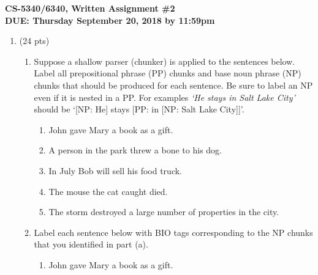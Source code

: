 \documentclass[11pt]{article}
\begin{document}
\large
\begin{center}
{\bf CS-5340/6340, Written Assignment \#2} \\
{\bf DUE: Thursday September 20, 2018 by 11:59pm}
\end{center}
\normalsize

\begin{enumerate}  



\item (24 pts)
\begin{enumerate} 

\item Suppose a shallow parser (chunker) is applied to the sentences
  below. Label all prepositional phrase (PP) chunks and base noun
  phrase (NP) chunks that should be produced for each sentence. Be sure
  to label an NP even if it is nested in a PP. For examples {\it `He stays
  in Salt Lake City'} should be `[NP: He] stays [PP: in [NP: Salt Lake
  City]]'. \\

\begin{enumerate}

\item John gave Mary a book as a gift.  	 
\vspace*{.3in}

\item A person in the park threw a bone to his dog.
\vspace*{.3in}

\item In July Bob will sell his food truck.
\vspace*{.3in} 

\item The mouse the cat caught died.
\vspace*{.3in}

\item The storm destroyed a large number of properties in the city. 
\vspace*{.3in}


\end{enumerate}
\item Label each sentence below with BIO tags corresponding to the NP
  chunks that you identified in part (a). \\


\begin{enumerate}

\item John gave Mary a book as a gift.  	
 

\end{enumerate}
\end{enumerate}
\end{enumerate}
\end{document}
